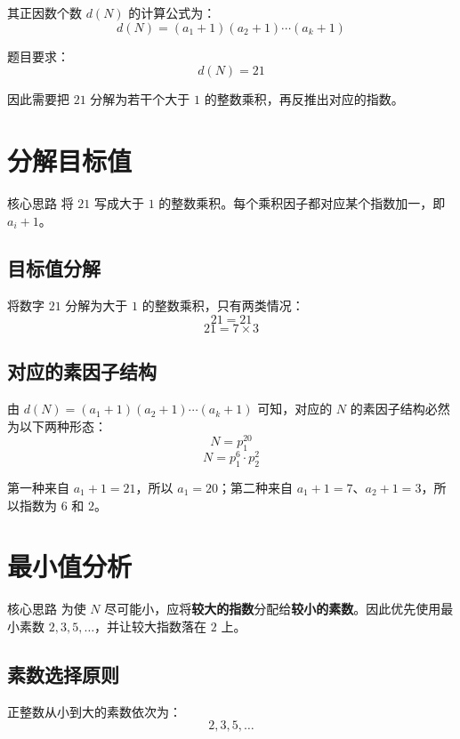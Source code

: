 \documentclass[11pt,a4paper]{ctexart}
\newcommand{\highlight}[1]{\colorbox{accent!20}{\sffamily\bfseries #1}}
\begin{document}
其正因数个数 $d(N)$ 的计算公式为：
\[
  d(N) = (a_1 + 1)(a_2 + 1) \cdots (a_k + 1)
\]

题目要求：
\[
  d(N)=21
\]

因此需要把 $21$ 分解为若干个大于 $1$ 的整数乘积，再反推出对应的指数。

\section{分解目标值}

\begin{methodbox}{核心思路}
将 $21$ 写成大于 $1$ 的整数乘积。每个乘积因子都对应某个指数加一，即 $a_i+1$。
\end{methodbox}

\subsection*{目标值分解}

将数字 $21$ 分解为大于 $1$ 的整数乘积，只有两类情况：
\[
  21 = 21
\]
\[
  21 = 7 \times 3
\]

\subsection*{对应的素因子结构}

由 $d(N)=(a_1+1)(a_2+1)\cdots(a_k+1)$ 可知，对应的 $N$ 的素因子结构必然为以下两种形态：
\[
  N = p_1^{20}
\]
\[
  N = p_1^6 \cdot p_2^2
\]

第一种来自 $a_1+1=21$，所以 $a_1=20$；第二种来自 $a_1+1=7$、$a_2+1=3$，所以指数为 $6$ 和 $2$。

\newpage

\section{最小值分析}

\begin{methodbox}{核心思路}
为使 $N$ 尽可能小，应将\highlight{较大的指数}分配给\highlight{较小的素数}。因此优先使用最小素数 $2,3,5,\ldots$，并让较大指数落在 $2$ 上。
\end{methodbox}

\subsection*{素数选择原则}

正整数从小到大的素数依次为：
\[
  2,3,5,\dots
\]
\end{document}
